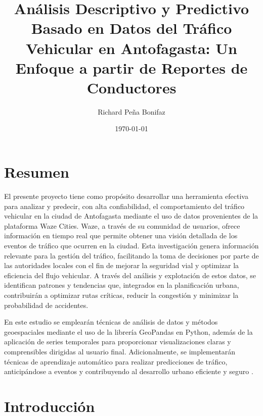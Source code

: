 \documentclass[12pt]{article}
\begin{document}
\title{Análisis Descriptivo y Predictivo Basado en Datos del Tráfico Vehicular en Antofagasta: Un Enfoque a partir de Reportes de Conductores}
\author{Richard Peña Bonifaz}
\date{\today}
\maketitle


\section*{Resumen}

El presente proyecto tiene como propósito desarrollar una herramienta efectiva para analizar y predecir, con alta confiabilidad, el comportamiento del tráfico vehicular en la ciudad de Antofagasta mediante el uso de datos provenientes de la plataforma Waze Cities. Waze, a través de su comunidad de usuarios, ofrece información en tiempo real que permite obtener una visión detallada de los eventos de tráfico que ocurren en la ciudad. Esta investigación genera información relevante para la gestión del tráfico, facilitando la toma de decisiones por parte de las autoridades locales con el fin de mejorar la seguridad vial y optimizar la eficiencia del flujo vehicular. A través del análisis y explotación de estos datos, se identifican patrones y tendencias que, integrados en la planificación urbana, contribuirán a optimizar rutas críticas, reducir la congestión y minimizar la probabilidad de accidentes.

En este estudio se emplearán técnicas de análisis de datos y métodos geoespaciales mediante el uso de la librería GeoPandas en Python, además de la aplicación de series temporales para proporcionar visualizaciones claras y comprensibles dirigidas al usuario final. Adicionalmente, se implementarán técnicas de aprendizaje automático para realizar predicciones de tráfico, anticipándose a eventos y contribuyendo al desarrollo urbano eficiente y seguro \parencite{barcelo2005}.

\section{Introducción}
\end{document}
